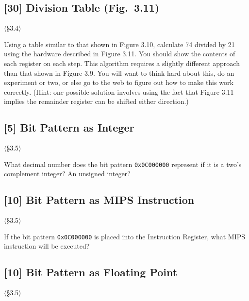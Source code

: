 \subsection{[30] Division Table (Fig.~3.11)}
\hypertarget{prob-3.19}{}
\noindent$\langle$\S3.4$\rangle$\medskip

\noindent Using a table similar to that shown in Figure 3.10, calculate 74
divided by 21 using the hardware described in Figure 3.11. You should show
the contents of each register on each step. This algorithm requires a
slightly different approach than that shown in Figure 3.9. You will want to
think hard about this, do an experiment or two, or else go to the web to
figure out how to make this work correctly. (Hint: one possible solution
involves using the fact that Figure 3.11 implies the remainder register can
be shifted either direction.)

\problembreak

\subsection{[5] Bit Pattern as Integer}
\hypertarget{prob-3.20}{}
\noindent$\langle$\S3.5$\rangle$\medskip

\noindent What decimal number does the bit pattern \texttt{0x0C000000}
represent if it is a two's complement integer? An unsigned integer?

\problembreak

\subsection{[10] Bit Pattern as MIPS Instruction}
\hypertarget{prob-3.21}{}
\noindent$\langle$\S3.5$\rangle$\medskip

\noindent If the bit pattern \texttt{0x0C000000} is placed into the
Instruction Register, what MIPS instruction will be executed?

\problembreak

\subsection{[10] Bit Pattern as Floating Point}
\hypertarget{prob-3.22}{}
\noindent$\langle$\S3.5$\rangle$\medskip

